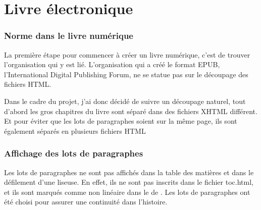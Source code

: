 \documentclass{article}
\begin{document}
\restoregeometry %
\nopagecolor%
\pagestyle{fancy}
\fancyhf{}
{
\hypersetup{linkcolor=black}
\tableofcontents
}
\newpage

\part{Livre électronique}
\setcounter{section}{0}
\section{Norme dans le livre numérique}
La première étape pour commencer à créer un livre numérique, c'est de trouver l'organisation qui y est lié. L'organisation qui a créé le format EPUB, l'International Digital Publishing Forum, ne se statue pas sur le découpage des fichiers HTML. 

Dans le cadre du projet, j'ai donc décidé de suivre un découpage naturel, tout d'abord les gros chapitres du livre sont séparé dans des fichiers XHTML différent. Et pour éviter que les lots de paragraphes soient sur la même page, ils sont également séparés en plusieurs fichiers HTML

\section{Affichage des lots de paragraphes}
Les lots de paragraphes ne sont pas affichés dans la table des matières et dans le défilement d'une liseuse. En effet, ils ne sont pas inscrits dans le fichier toc.html, et ils sont marqués comme non linéaire dans le  de . Les lots de paragraphes ont été choisi pour assurer une continuité dans l'histoire.
\end{document}
